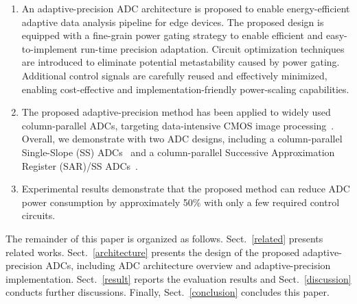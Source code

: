 \begin{enumerate}[\IEEEsetlabelwidth{3)}]
\item 
An adaptive-precision ADC architecture is proposed to enable energy-efficient adaptive data analysis pipeline for edge devices. 
The proposed design is equipped with a fine-grain power gating strategy to enable efficient and easy-to-implement run-time precision adaptation.
Circuit optimization techniques are introduced to eliminate potential metastability caused by power gating. 
Additional control signals are carefully reused and effectively minimized, enabling cost-effective and implementation-friendly power-scaling 
capabilities.  
\item 
The proposed adaptive-precision method has been applied to widely used column-parallel ADCs, targeting data-intensive CMOS image 
processing~\cite{kim_11-bit_2021,nie_single_2020,kumagai_14-inch_2018,park_640_2020}. Overall, we demonstrate with two ADC designs, including 
a column-parallel Single-Slope (SS) ADCs~\cite{snoeij_18v_2005,kleinfelder_10000_2001} and a column-parallel Successive Approximation Register (SAR)/SS ADCs~\cite{kim_area-efficient_2016}. 


	\item 
	Experimental results demonstrate that the proposed method can reduce ADC power consumption by approximately 50\% with only a few required control circuits.

\end{enumerate} 

The remainder of this paper is organized as follows. 
Sect.~\ref{related} presents related works.
Sect.~\ref{architecture} presents the design of the proposed adaptive-precision ADCs, including ADC architecture overview and adaptive-precision implementation. 
Sect.~\ref{result} reports the evaluation results and Sect.~\ref{discussion} conducts further discussions. 
Finally, Sect.~\ref{conclusion} concludes this paper.
